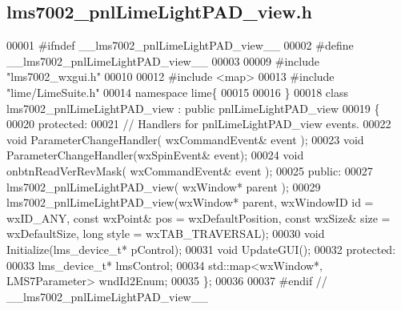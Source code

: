 \subsection{lms7002\+\_\+pnl\+Lime\+Light\+P\+A\+D\+\_\+view.\+h}
\label{lms7002__pnlLimeLightPAD__view_8h_source}

\begin{DoxyCode}
00001 \textcolor{preprocessor}{#ifndef \_\_lms7002\_pnlLimeLightPAD\_view\_\_}
00002 \textcolor{preprocessor}{#define \_\_lms7002\_pnlLimeLightPAD\_view\_\_}
00003 
00009 \textcolor{preprocessor}{#include "lms7002_wxgui.h"}
00010 
00012 \textcolor{preprocessor}{#include <map>}
00013 \textcolor{preprocessor}{#include "lime/LimeSuite.h"}
00014 \textcolor{keyword}{namespace }lime\{
00015 
00016 \}
00018 \textcolor{keyword}{class }lms7002_pnlLimeLightPAD_view : \textcolor{keyword}{public} pnlLimeLightPAD_view
00019 \{
00020     \textcolor{keyword}{protected}:
00021         \textcolor{comment}{// Handlers for pnlLimeLightPAD\_view events.}
00022         \textcolor{keywordtype}{void} ParameterChangeHandler( wxCommandEvent& event );
00023         \textcolor{keywordtype}{void} ParameterChangeHandler(wxSpinEvent& event);
00024         \textcolor{keywordtype}{void} onbtnReadVerRevMask( wxCommandEvent& event );
00025     \textcolor{keyword}{public}:
00027         lms7002_pnlLimeLightPAD_view( wxWindow* parent );
00029         lms7002_pnlLimeLightPAD_view(wxWindow* parent, wxWindowID \textcolor{keywordtype}{id} = wxID\_ANY, \textcolor{keyword}{const} wxPoint& pos = 
      wxDefaultPosition, \textcolor{keyword}{const} wxSize& size = wxDefaultSize, \textcolor{keywordtype}{long} style = wxTAB\_TRAVERSAL);
00030     \textcolor{keywordtype}{void} Initialize(lms_device_t* pControl);
00031     \textcolor{keywordtype}{void} UpdateGUI();
00032 \textcolor{keyword}{protected}:
00033     lms_device_t* lmsControl;
00034     std::map<wxWindow*, LMS7Parameter> wndId2Enum;
00035 \};
00036 
00037 \textcolor{preprocessor}{#endif // \_\_lms7002\_pnlLimeLightPAD\_view\_\_}
\end{DoxyCode}
